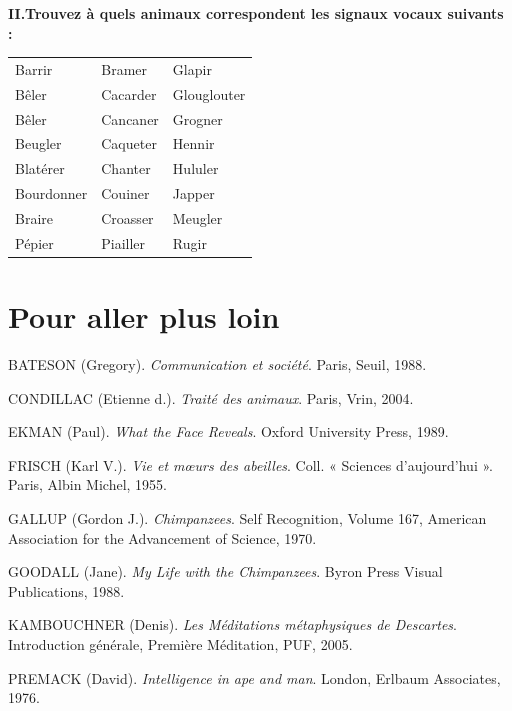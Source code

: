 \noindent\textbf{II.\quad Trouvez à quels animaux correspondent les signaux vocaux suivants :}
\begin{center}\renewcommand{\arraystretch}{1.1}
\begin{tabularx}{.9\linewidth}{XXX}
Barrir&Bramer&Glapir\\
Bêler&Cacarder&Glouglouter\\
Bêler&Cancaner&Grogner\\
Beugler&Caqueter&Hennir\\
Blatérer&Chanter&Hululer\\
Bourdonner&Couiner&Japper\\
Braire&Croasser&Meugler\\
Pépier&Piailler&Rugir\\
\end{tabularx}
\end{center}
\noindent{}
\section*{Pour aller plus loin}
\begingroup\small\setlength{\parindent}{-4mm}\leftskip=4mm
BATESON (Gregory). \textit{Communication et société}. Paris, Seuil, 1988.

CONDILLAC (Etienne d.). \textit{Traité des animaux}. Paris, Vrin, 2004.

EKMAN (Paul). \textit{What the Face Reveals}. Oxford University Press, 1989.

FRISCH (Karl V.). \textit{Vie et mœurs des abeilles}. Coll. « Sciences d’aujourd’hui ». Paris, Albin Michel, 1955.

GALLUP (Gordon J.). \textit{Chimpanzees}. Self Recognition, Volume 167, American Association for the Advancement of Science, 1970.

GOODALL (Jane). \textit{My Life with the Chimpanzees}. Byron Press Visual Publications, 1988.

KAMBOUCHNER (Denis). \textit{Les Méditations métaphysiques de Descartes}. Introduction générale, Première Méditation, PUF, 2005.

PREMACK (David). \textit{Intelligence in ape and man}. London, Erlbaum Associates, 1976.

